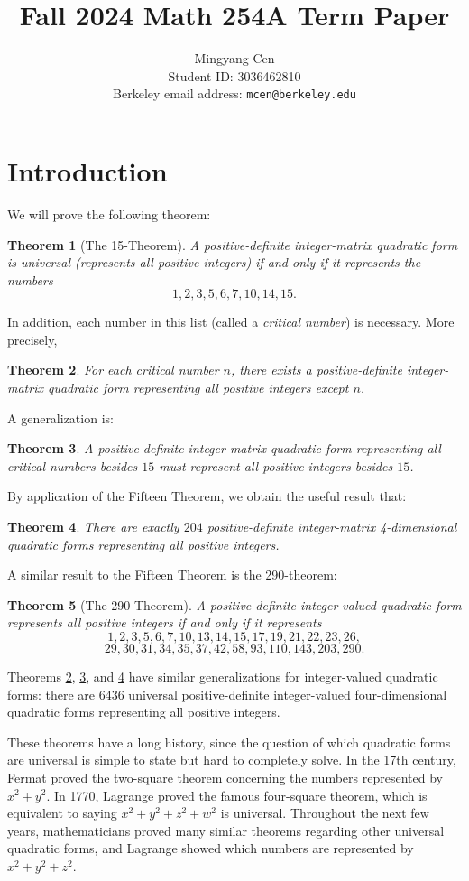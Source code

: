 \documentclass{article}
\title{Fall 2024 Math 254A Term Paper}
\author{Mingyang Cen \\ Student ID: 3036462810 \\ Berkeley email address: \texttt{mcen@berkeley.edu}}
\newtheorem{thm}{Theorem}
\begin{document}
\maketitle

\section{Introduction}
We will prove the following theorem:
\begin{thm}[The 15-Theorem]\label{15thm}
    A positive-definite integer-matrix quadratic form is universal (represents all positive integers) if and only if it represents the numbers
    \[1, 2, 3, 5, 6, 7, 10, 14, 15.\]
\end{thm}
In addition, each number in this list (called a \emph{critical number}) is necessary. More precisely,
\begin{thm}\label{critnumsneeded}
    For each critical number $n$, there exists a positive-definite integer-matrix quadratic form representing all positive integers except $n$.
\end{thm}
A generalization is:
\begin{thm}\label{15thmgeneral}
    A positive-definite integer-matrix quadratic form representing all critical numbers besides $15$ must represent all positive integers besides $15$.
\end{thm}
By application of the Fifteen Theorem, we obtain the useful result that:
\begin{thm}\label{universal 4d}
    There are exactly $204$ positive-definite integer-matrix 4-dimensional quadratic forms representing all positive integers.
\end{thm}
A similar result to the Fifteen Theorem is the 290-theorem:
\begin{thm}[The 290-Theorem]
    A positive-definite integer-valued quadratic form represents all positive integers if and only if it represents
    \[1, 2, 3, 5, 6, 7, 10, 13, 14, 15, 17, 19, 21, 22, 23, 26,\]
    \[29, 30, 31, 34, 35, 37, 42, 58, 93, 110, 143, 203, 290.\]
\end{thm}
Theorems \ref{critnumsneeded}, \ref{15thmgeneral}, and \ref{universal 4d} have similar generalizations for integer-valued quadratic forms: there are 6436 universal positive-definite integer-valued four-dimensional quadratic forms representing all positive integers.

These theorems have a long history, since the question of which quadratic forms are universal is simple to state but hard to completely solve.
In the 17th century, Fermat proved the two-square theorem concerning the numbers represented by $x^2 + y^2$. In 1770, Lagrange proved the famous four-square theorem, which is equivalent to saying $x^2 + y^2 + z^2 + w^2$ is universal.
Throughout the next few years, mathematicians proved many similar theorems regarding other universal quadratic forms, and Lagrange showed which numbers are represented by $x^2 + y^2 + z^2$.
\end{document}
